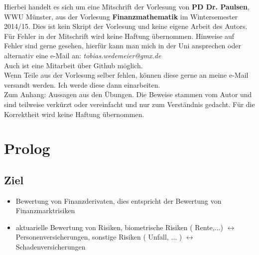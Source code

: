 \maketitle
\thispagestyle{empty}
\newpage

\thispagestyle{empty}
\vspace*{\fill}
\begin{center}
	Hierbei handelt es sich um eine Mitschrift der Vorlesung von \textbf{PD Dr. Paulsen}, WWU Münster, aus der Vorlesung \textbf{Finanzmathematik} im Wintersemester 2014/15. Dies ist kein Skript der Vorlesung und keine eigene Arbeit des Autors.\\
	\vspace{2cm}
	Für Fehler in der Mitschrift wird keine Haftung übernommen. Hinweise auf Fehler sind gerne gesehen, hierfür kann man mich in der Uni ansprechen oder alternativ eine e-Mail an: \textit{tobias.wedemeier@gmx.de}\\
	Auch ist eine Mitarbeit über Github möglich.\\
	\vspace{2cm}
	Wenn Teile aus der Vorlesung selber fehlen, können diese gerne an meine e-Mail versandt werden. Ich werde diese dann einarbeiten.\\
	\vspace{2cm}
	Zum Anhang: Aussagen aus den Übungen. Die Beweise stammen vom Autor und sind teilweise verkürzt oder vereinfacht und nur zum Verständnis gedacht. Für die Korrektheit wird keine Haftung übernommen.
\end{center}
\vspace*{\fill}
\newpage


\tableofcontents
\cleardoubleoddemptypage %

\setcounter{page}{1}

\section*{Prolog}  %
\label{sec:prolog}

\subsection*{Ziel} %
\label{sub:ziel}

\begin{itemize}
	\item Bewertung von Finanzderivaten, dies entspricht der Bewertung von Finanzmarktrisiken
	\item aktuarielle Bewertung von Risiken, biometrische Risiken ( Rente,$\dots$) $\leftrightarrow$ Personenversicherungen,
		sonstige Risiken ( Unfall, $\dots$ ) $\leftrightarrow$ Schadenversicherungen
\end{itemize}


